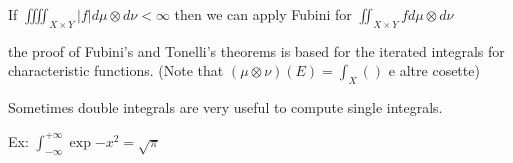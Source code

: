 If \(\iiiint_{X \times Y} \vert f \vert d\mu \otimes d\nu < \infty\) then we can apply Fubini for \(\iint_{X \times Y} f d\mu \otimes d\nu\)
\begin{remark}
    the proof of Fubini's and Tonelli's theorems is based for the iterated integrals for characteristic functions.
    (Note that \((\mu \otimes \nu)(E) = \int_X ()\) e altre cosette)
\end{remark}
\begin{remark}
    Sometimes double integrals are very useful to compute single integrals.
\end{remark}
Ex: \(\int_{-\infty}^{+\infty}\exp{-x^2} = \sqrt{\pi}\)



